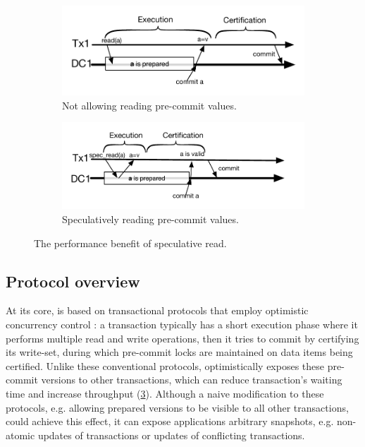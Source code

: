 \begin{figure}[t]
\centering
\begin{subfigure}[t!]{0.95\linewidth}
\def\svgwidth{0.95\columnwidth}
\centering \includegraphics[scale = 0.65]{figures/NoSpeculativeRead}
\vspace{-8mm}
\caption{\footnotesize Not allowing reading pre-commit values.}
\label{fig:remote:a}
\end{subfigure}

\begin{subfigure}[t!]{0.95\linewidth}
\vspace{1mm}
\def\svgwidth{0.95\columnwidth}
\centering \includegraphics[scale = 0.65]{figures/YesSpeculativeRead}%
\vspace{-5mm}
\caption{\footnotesize Speculatively reading pre-commit values.}
\label{fig:remote:b}
\end{subfigure}
\caption{The performance benefit of speculative read.}
\label{fig:specularead}
\end{figure}


\subsection{Protocol overview}
\label{sub:sc}
At its core, \specula is based on transactional protocols that employ optimistic concurrency control \cite{clocksi, mdcc}: a transaction typically has a short execution phase where it performs multiple read and write operations, then it tries to commit by certifying its write-set, during which pre-commit locks are maintained on data items being certified. Unlike these conventional protocols, \specula optimistically exposes these pre-commit versions to other transactions, which can reduce transaction's waiting time and increase throughput (\ref{fig:specularead}). Although a naive modification to these protocols, e.g. allowing prepared versions to be visible to all other transactions, could achieve this effect, it can expose applications arbitrary snapshots, e.g. non-atomic updates of transactions or updates of conflicting transactions.

